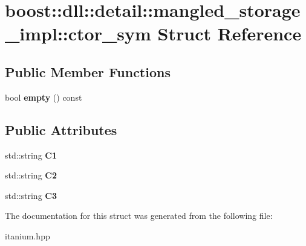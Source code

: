 \hypertarget{a00070}{}\section{boost\+:\+:dll\+:\+:detail\+:\+:mangled\+\_\+storage\+\_\+impl\+:\+:ctor\+\_\+sym Struct Reference}
\label{a00070}
\subsection*{Public Member Functions}
\begin{DoxyCompactItemize}
\item 
bool {\bfseries empty} () const \hypertarget{a00070_a9f13541f75c2e20cd9c715b1cc9d1790}{}\label{a00070_a9f13541f75c2e20cd9c715b1cc9d1790}

\end{DoxyCompactItemize}
\subsection*{Public Attributes}
\begin{DoxyCompactItemize}
\item 
std\+::string {\bfseries C1}\hypertarget{a00070_ac9013659c224761b2a4ed93497a5befe}{}\label{a00070_ac9013659c224761b2a4ed93497a5befe}

\item 
std\+::string {\bfseries C2}\hypertarget{a00070_a16e1494cd3bad943a255c357107ff317}{}\label{a00070_a16e1494cd3bad943a255c357107ff317}

\item 
std\+::string {\bfseries C3}\hypertarget{a00070_a9fb3a1d9ebd5863d39914a4ffa1cf2de}{}\label{a00070_a9fb3a1d9ebd5863d39914a4ffa1cf2de}

\end{DoxyCompactItemize}


The documentation for this struct was generated from the following file\+:\begin{DoxyCompactItemize}
\item 
itanium.\+hpp\end{DoxyCompactItemize}
